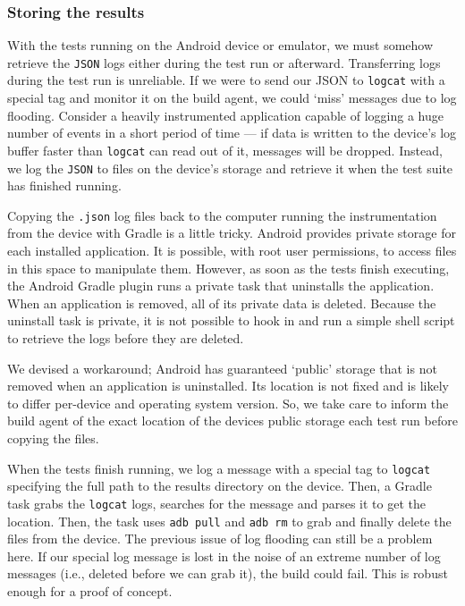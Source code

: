 \subsubsection{Storing the results}

With the tests running on the Android device or emulator, we must somehow retrieve the {\tt JSON} logs either during the test run or afterward. Transferring logs during the test run is unreliable. If we were to send our JSON to {\tt logcat} with a special tag and monitor it on the build agent, we could {\lq}miss{\rq} messages due to log flooding. Consider a heavily instrumented application capable of logging a huge number of events in a short period of time --- if data is written to the device's log buffer faster than {\tt logcat} can read out of it, messages will be dropped. Instead, we log the {\tt JSON} to files on the device's storage and retrieve it when the test suite has finished running.

Copying the {\tt .json} log files back to the computer running the instrumentation from the device with Gradle is a little tricky. Android provides private storage for each installed application. It is possible, with root user permissions, to access files in this space to manipulate them. However, as soon as the tests finish executing, the Android Gradle plugin runs a private task that uninstalls the application. When an application is removed, all of its private data is deleted. Because the uninstall task is private, it is not possible to hook in and run a simple shell script to retrieve the logs before they are deleted.

We devised a workaround; Android has guaranteed {\lq}public{\rq} storage that is not removed when an application is uninstalled. Its location is not fixed and is likely to differ per-device and operating system version. So, we take care to inform the build agent of the exact location of the devices public storage each test run before copying the files.

When the tests finish running, we log a message with a special tag to {\tt logcat} specifying the full path to the results directory on the device. Then, a Gradle task grabs the {\tt logcat} logs, searches for the message and parses it to get the location. Then, the task uses {\tt adb pull} and {\tt adb rm} to grab and finally delete the files from the device. The previous issue of log flooding can still be a problem here. If our special log message is lost in the noise of an extreme number of log messages (i.e., deleted before we can grab it), the build could fail. This is robust enough for a proof of concept.

